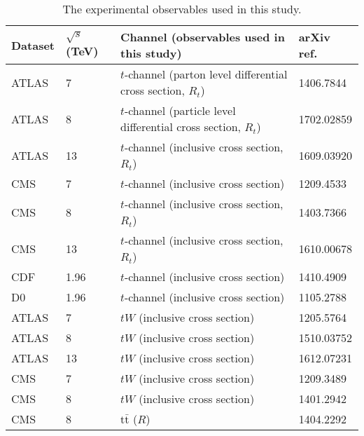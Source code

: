 \documentclass[11pt]{article}
\begin{document}
\begin{table}[ht]
\centering
\caption{The experimental observables used in this study.}
\label{exp-results}
\begin{tabular}{llll}
\hline
Dataset & $\sqrt{s}$ (TeV) & Channel (observables used in this study) & arXiv ref. \\
\hline
\hline
ATLAS   &  7              &  $t$-channel (parton level differential cross section, $R_t$)            &    1406.7844 \cite{Aad:2014fwa}        \\
ATLAS   &  8              &  $t$-channel (particle level differential cross section, $R_t$)            &    1702.02859 \cite{Aaboud:2017pdi}     \\
ATLAS   &  13             &  $t$-channel (inclusive cross section, $R_t$)            &    1609.03920 \cite{Aaboud:2016ymp}     \\
CMS   &  7                &  $t$-channel (inclusive cross section)            &    1209.4533 \cite{Chatrchyan:2012ep}     \\
CMS   &  8                &  $t$-channel (inclusive cross section, $R_t$)            &    1403.7366 \cite{Khachatryan:2014iya}     \\
CMS   &  13               &  $t$-channel (inclusive cross section, $R_t$)            &    1610.00678 \cite{Sirunyan:2016cdg}     \\
CDF   &  1.96             &  $t$-channel (inclusive cross section)            &  1410.4909 \cite{Aaltonen:2014mza}           \\
D0    &  1.96             &  $t$-channel (inclusive cross section)            &  1105.2788 \cite{Abazov:2011rz}           \\
ATLAS   &  7              &  $tW$ (inclusive cross section)            &    1205.5764 \cite{Aad:2012xca}        \\
ATLAS   &  8              &  $tW$ (inclusive cross section)            &    1510.03752 \cite{Aad:2015eto}     \\
ATLAS   &  13             &  $tW$ (inclusive cross section)            &    1612.07231 \cite{Aaboud:2016lpj}     \\
CMS   &  7                &  $tW$ (inclusive cross section)            &    1209.3489 \cite{Chatrchyan:2012zca}     \\
CMS   &  8                &  $tW$ (inclusive cross section)            &    1401.2942 \cite{Chatrchyan:2014tua}     \\
CMS   &  8                &  t$\bar{\text{t}}$ ($R$)        &    1404.2292 \cite{Khachatryan:2014nda}     \\ \hline
\end{tabular}
\end{table}
\end{document}
